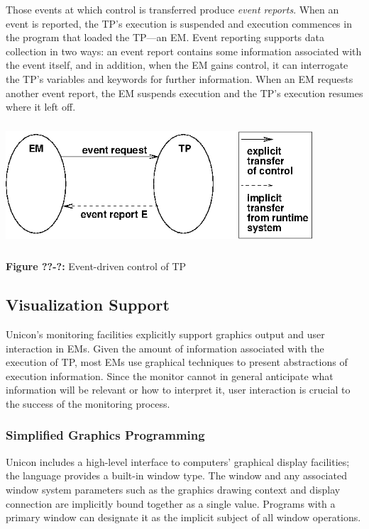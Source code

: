 Those events at which control is transferred produce {\em event reports\/}.
When an event is reported, the TP's execution is suspended
and execution commences in the program that loaded the TP---an EM.
Event reporting supports data collection in two ways: an event report
contains some information associated with the event itself, and in
addition, when the EM gains control, it can interrogate the TP's variables
and keywords for further information.  When an EM requests another
event report, the EM suspends execution and the TP's execution resumes
where it left off.

\begin{center}
\includegraphics[width=27pc,height=1.8in]{execinf.png}
\end{center}

{\sffamily\bfseries Figure ??-?:}
{\sffamily Event-driven control of TP}

\subsection*{Visualization Support}

Unicon's monitoring facilities explicitly support graphics output and
user interaction in EMs.
Given the amount of information associated with the execution of TP, most
EMs use graphical techniques to present abstractions of execution
information.  Since the monitor cannot in general anticipate what
information will be relevant or how to interpret it, user interaction is
crucial to the success of the monitoring process.

\subsubsection*{Simplified Graphics Programming}


Unicon includes a high-level interface to computers' graphical display
facilities; the language provides a built-in window
type.  The window and any associated window system parameters such as the
graphics drawing context and display connection are implicitly bound
together as a single value.  Programs with a primary window can
designate it as the implicit subject of all window operations.

